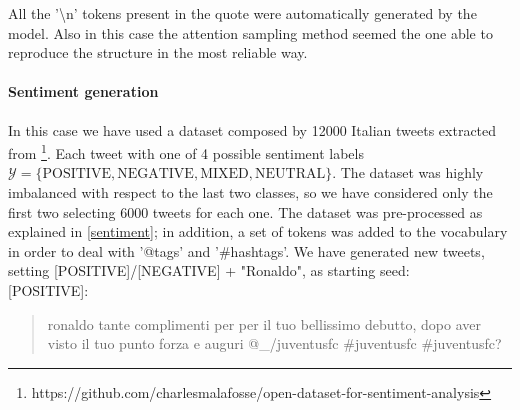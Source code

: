 \documentclass[10pt,twocolumn,letterpaper]{article}
\begin{document}
%
%
%
%

All the '\textbackslash n' tokens present in the quote were automatically generated by the model.
Also in this case the attention sampling method seemed the one able to reproduce the structure in the most reliable way.


\paragraph{Sentiment generation} In this case we have used a dataset
composed by 12000 Italian tweets extracted from
\footnote[1]{https://github.com/charlesmalafosse/open-dataset-for-sentiment-analysis}.
Each tweet with one of 4 possible sentiment labels
$\mathcal Y = \{\text{POSITIVE}, \text{NEGATIVE}, \text{MIXED}, \text{NEUTRAL}\}$.
The dataset was highly imbalanced with respect to the last two classes, so we have considered only the first two
selecting 6000 tweets for each one.
The dataset was pre-processed as explained in \ref{sentiment}; in addition, a set of tokens was added to the vocabulary
in order to deal with '@tags' and '#hashtags'. We have generated new tweets, setting [POSITIVE]/[NEGATIVE] + "Ronaldo", as starting seed:\\

[POSITIVE]:
\begin{quote}
   ronaldo tante complimenti per per il tuo bellissimo debutto, dopo aver visto il tuo punto forza e auguri @\_/juventusfc #juventusfc #juventusfc?
\end{quote}
\end{document}

